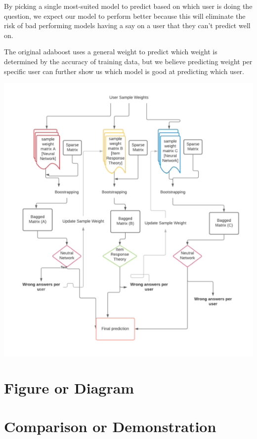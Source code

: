 \documentclass{article}
\begin{document}
    By picking a single most-suited model to predict based on which user is doing the question, we expect our model to perform better because this will eliminate the risk of bad performing models having a say on a user that they can’t predict well on.

    The original adaboost uses a general weight to predict which weight is determined by the accuracy of training data, but we believe predicting weight per specific user can further show us which model is good at predicting which user.

    \includegraphics[scale=0.55]{figures/pb_f3.png}

    \section{Figure or Diagram}
    \section{Comparison or Demonstration}
\end{document}
